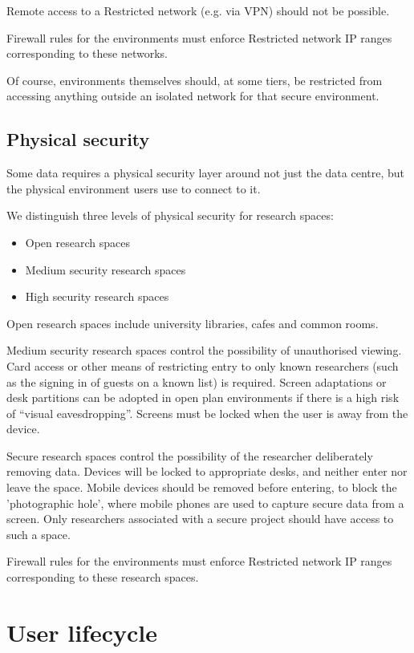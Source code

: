 \documentclass[10pt,a4paper,twocolumn]{article}
\begin{document}
Remote access to a Restricted network (e.g. via VPN) should not be possible.

Firewall rules for the environments must enforce Restricted network IP ranges corresponding to these networks.

Of course, environments themselves should, at some tiers, be restricted from accessing anything outside an isolated network for that secure environment.

\subsection{Physical security}
\label{sec:physicalsecurity}

Some data requires a physical security layer around not just the data centre,
but the physical environment users use to connect to it.

We distinguish three levels of physical security for research spaces:

\begin{itemize}
    \item Open research spaces
    \item Medium security research spaces
    \item High security research spaces
\end{itemize}

Open research spaces include university libraries, cafes and common rooms.

Medium security research spaces control the possibility of unauthorised viewing.
Card access or other means of restricting entry to only known researchers (such as the signing in of guests on a known list) is required. Screen adaptations or desk partitions can be adopted in open plan environments if there is a high risk of ``visual eavesdropping''. Screens must be locked when the user is away from the device.

Secure research spaces control the possibility of the researcher deliberately
removing data. Devices will be locked to appropriate desks, and neither enter nor leave 
the space. Mobile devices should be removed before entering, to block the 'photographic hole',
where mobile phones are used to capture secure data from a screen. Only researchers associated with a secure project should have access to such a space.

Firewall rules for the environments must enforce Restricted network IP ranges corresponding to these 
research spaces.

\section{User lifecycle}
\end{document}
